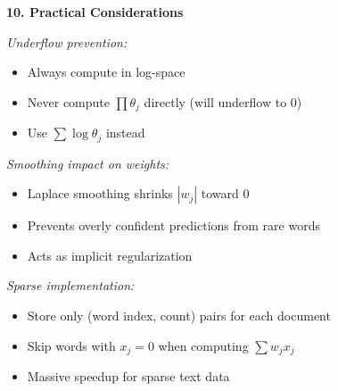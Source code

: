 \documentclass[12pt]{article}
\begin{document}
\begin{explanation}
\textbf{10. Practical Considerations}

\textit{Underflow prevention:}
\begin{itemize}
    \item Always compute in log-space
    \item Never compute $\prod \theta_j$ directly (will underflow to 0)
    \item Use $\sum \log \theta_j$ instead
\end{itemize}

\textit{Smoothing impact on weights:}
\begin{itemize}
    \item Laplace smoothing shrinks $|w_j|$ toward 0
    \item Prevents overly confident predictions from rare words
    \item Acts as implicit regularization
\end{itemize}

\textit{Sparse implementation:}
\begin{itemize}
    \item Store only (word index, count) pairs for each document
    \item Skip words with $x_j = 0$ when computing $\sum w_j x_j$
    \item Massive speedup for sparse text data
\end{itemize}
\end{explanation}
\end{document}

